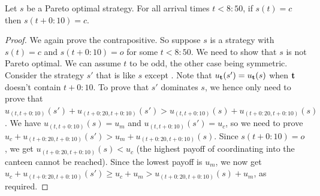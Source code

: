 \begin{lemma}\label{lemma:canteen-propagate} 
Let $s$ be a Pareto optimal strategy. For all arrival times $t < 8{:}50$, if $s(t)= c$ then $s(t+0{:}10) = c$.
\end{lemma}
\begin{proof}
  We again prove the contrapositive. So suppose
$s$ is a strategy with $s(t) = c$ and $s(t+0{:}10) = o$ for some $t < 8{:}50$. We need to show that $s$ is not Pareto optimal. We can assume $t$ to be odd, the other case being symmetric. Consider the strategy $s'$ that is like $s$ except . Note that $u_{\bf t}(s') = u_{\bf t}(s)$ when $\bf t$ doesn't contain $t+0{:}10$. To prove that $s'$ dominates $s$, we hence only need to prove that $u_{(t,t+0{:}10)}(s') + u_{(t+0{:}20,t+0{:}10)}(s') > u_{(t,t+0{:}10)}(s) + u_{(t+0{:}20,t+0{:}10)}(s)$.
We have $u_{(t,t+0{:}10)}(s) = u_m$ and $u_{(t,t+0{:}10)}(s') = u_c$, so we need to prove $u_c + u_{(t+0{:}20,t+0{:}10)}(s') > u_m + u_{(t+0{:}20,t+0{:}10)}(s)$. Since $s(t+0{:}10) = o$, we get $u_{(t+0{:}20,t+0{:}10)}(s) < u_c$ (the highest payoff of coordinating into the canteen cannot be reached). Since the lowest payoff is $u_m$, we now get $u_c + u_{(t+0{:}20,t+0{:}10)}(s') \geq u_c + u_m > u_{(t+0{:}20,t+0{:}10)}(s) + u_m$, as required.
%
\end{proof}

